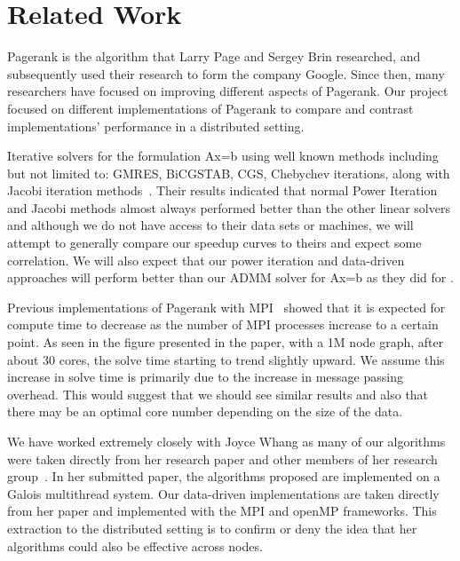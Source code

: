 \documentclass[letterpaper,11pt,onecolumn]{article}
\begin{document}
\section{Related Work}

Pagerank is the algorithm that Larry Page and Sergey Brin researched, and subsequently used their research to form the company Google. Since then, many researchers have focused on improving different aspects of Pagerank. Our project focused on different implementations of Pagerank to compare and contrast implementations' performance in a distributed setting. 

Iterative solvers for the formulation Ax=b using well known methods including but not limited to: GMRES, BiCGSTAB, CGS, Chebychev iterations, along with Jacobi iteration methods~\cite{FastParallel}. Their results indicated that normal Power Iteration and Jacobi methods almost always performed better than the other linear solvers and although we do not have access to their data sets or machines, we will attempt to generally compare our speedup curves to theirs and expect some correlation. We will also expect that our power iteration and data-driven approaches will perform better than our ADMM solver for Ax=b as they did for \cite{FastParallel}.
 
Previous implementations of Pagerank with MPI~\cite{MPIPR} showed that it is expected for compute time to decrease as the number of MPI processes increase to a certain point. As seen in the figure presented in the paper, with a 1M node graph, after about 30 cores, the solve time starting to trend slightly upward. We assume this increase in solve time is primarily due to the increase in message passing overhead. This would suggest that we should see similar results and also that there may be an optimal core number depending on the size of the data. 

We have worked extremely closely with Joyce Whang as many of our algorithms were taken directly from her research paper and other members of her research group~\cite{Joyce}. In her submitted paper, the algorithms proposed are implemented on a Galois multithread system. Our data-driven implementations are taken directly from her paper and implemented with the MPI and openMP frameworks. This extraction to the distributed setting is to confirm or deny the idea that her algorithms could also be effective across nodes.
\end{document}
